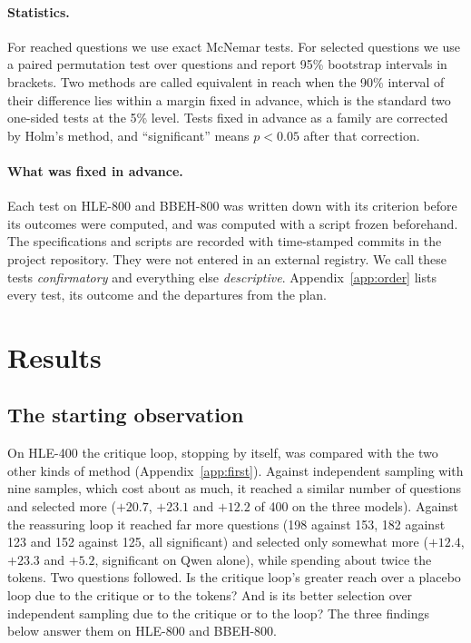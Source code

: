 \documentclass[11pt]{article}
\newcommand{\qw}{Qwen}
\begin{document}
\paragraph{Statistics.}
For reached questions we use exact McNemar tests.
For selected questions we use a paired permutation test over questions and report 95\% bootstrap intervals in brackets.
Two methods are called equivalent in reach when the 90\% interval of their difference lies within a margin fixed in advance, which is the standard two one-sided tests at the 5\% level.
Tests fixed in advance as a family are corrected by Holm's method, and ``significant'' means $p<0.05$ after that correction.

\paragraph{What was fixed in advance.}
Each test on HLE-800 and BBEH-800 was written down with its criterion before its outcomes were computed, and was computed with a script frozen beforehand.
The specifications and scripts are recorded with time-stamped commits in the project repository. They were not entered in an external registry.
We call these tests \emph{confirmatory} and everything else \emph{descriptive}.
Appendix~\ref{app:order} lists every test, its outcome and the departures from the plan.

\section{Results}

\subsection{The starting observation}
\label{sec:first}

On HLE-400 the critique loop, stopping by itself, was compared with the two other kinds of method (Appendix~\ref{app:first}).
Against independent sampling with nine samples, which cost about as much, it reached a similar number of questions and selected more ($+20.7$, $+23.1$ and $+12.2$ of 400 on the three models).
Against the reassuring loop it reached far more questions (198 against 153, 182 against 123 and 152 against 125, all significant) and selected only somewhat more ($+12.4$, $+23.3$ and $+5.2$, significant on \qw{} alone), while spending about twice the tokens.
Two questions followed.
Is the critique loop's greater reach over a placebo loop due to the critique or to the tokens?
And is its better selection over independent sampling due to the critique or to the loop?
The three findings below answer them on HLE-800 and BBEH-800.
\end{document}
